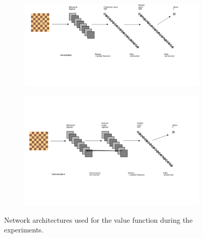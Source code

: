 \documentclass[twocolumn]{phdsymp} %
\begin{document}
\begin{figure}
\centering
\begin{subfigure}{0.4\textwidth}
\includegraphics[trim={0 6cm 0 0cm},clip,scale=0.24]{arch/fc}
\label{fig:fnn}
\end{subfigure}
\begin{subfigure}{0.4\textwidth}
\includegraphics[trim={0 6cm 0 6cm},clip,scale=0.24]{arch/cnn1}
\label{fig:cnn1}
\end{subfigure}
\caption{Network architectures used for the value function during the experiments.}
\end{figure}
\end{document}
